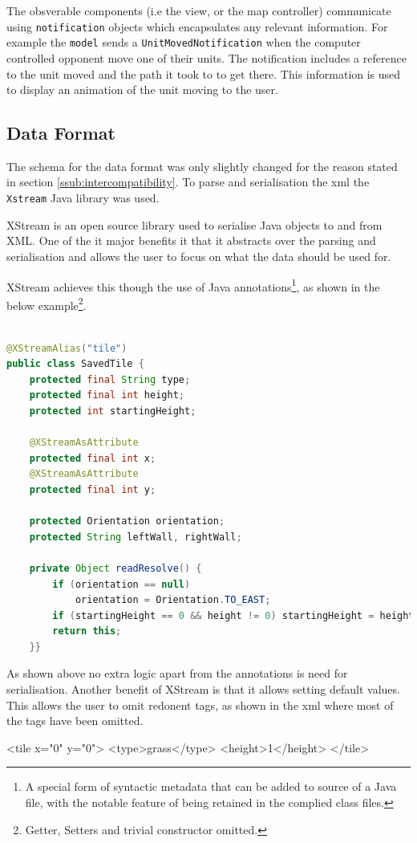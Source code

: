 

The obsverable components (i.e the view, or the map controller) communicate using \texttt{notification} objects which encapsulates any relevant information. For example the \texttt{model} sends a \texttt{UnitMovedNotification} when the computer controlled opponent move one of their units. The notification includes a reference to the unit moved and the path it took to to get there. This information is used to display an animation of the unit moving to the user.

\clearpage
\subsection{Data Format}
The schema for the data format was only slightly changed for the reason stated in section \ref{ssub:intercompatibility}. To parse and serialisation the xml  the \texttt{Xstream} Java library was used.

XStream is an open source library used to serialise Java objects to and from XML. One of the it major benefits it that it abstracts over the parsing and serialisation and allows the user to focus on what the data should be used for. 

XStream achieves this though the use of Java annotations\footnote{A special form of syntactic metadata that can be added to source of a Java file, with the notable feature of being retained in the complied class files.	}, as shown in the below example\footnote{Getter, Setters and trivial constructor omitted.}.

\begin{lstlisting}[caption=Example of class that is serialisable with XStream, label=lst:SavedTile, language=java] %Java
	
@XStreamAlias("tile")
public class SavedTile {
	protected final String type;
	protected final int height; 
	protected int startingHeight;
	
	@XStreamAsAttribute
	protected final int x;
	@XStreamAsAttribute
	protected final int y;

	protected Orientation orientation;
	protected String leftWall, rightWall;
	
	private Object readResolve() {
		if (orientation == null)  
			orientation = Orientation.TO_EAST;
		if (startingHeight == 0 && height != 0) startingHeight = height;
		return this;
	}}
\end{lstlisting}
As shown above no extra logic apart from the annotations is need for serialisation.  Another benefit of XStream is that it allows setting default values. This allows the user to omit redonent tags, as shown in the xml where most of the tags have been omitted.
\begin{lst:tile}[caption=Serialised form of the above class. ]
<tile x="0" y="0">
	<type>grass</type>
	<height>1</height>
</tile>
\end{lst:tile}

